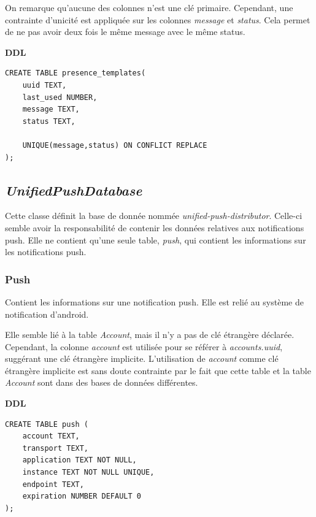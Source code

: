 \documentclass[a4paper,11pt]{article}
\begin{document}
On remarque qu'aucune des colonnes n'est une clé primaire. Cependant, une contrainte d'unicité est appliquée sur les colonnes \textit{message} et \textit{status}. Cela permet de ne pas avoir deux fois le même message avec le même status.

\textbf{DDL}
\begin{lstlisting}
CREATE TABLE presence_templates(
    uuid TEXT,
    last_used NUMBER,
    message TEXT,
    status TEXT,
    
    UNIQUE(message,status) ON CONFLICT REPLACE
);
\end{lstlisting}

\subsection{\textit{UnifiedPushDatabase}}

Cette classe définit la base de donnée nommée \textit{unified-push-distributor}. Celle-ci semble avoir la responsabilité de contenir les données relatives aux notifications push. Elle ne contient qu'une seule table, \textit{push}, qui contient les informations sur les notifications push.

\subsubsection{Push}

Contient les informations sur une notification push. Elle est relié au système de notification d'android.

Elle semble lié à la table \textit{Account}, mais il n'y a pas de clé étrangère déclarée. Cependant, la colonne \textit{account} est utilisée pour se référer à \textit{accounts.uuid}, suggérant une clé étrangère implicite. L'utilisation de \textit{account} comme clé étrangère implicite est sans doute contrainte par le fait que cette table et la table \textit{Account} sont dans des bases de données différentes.

\textbf{DDL}
\begin{lstlisting}
CREATE TABLE push (
	account TEXT,
	transport TEXT,
	application TEXT NOT NULL,
	instance TEXT NOT NULL UNIQUE,
	endpoint TEXT,
	expiration NUMBER DEFAULT 0
);
\end{lstlisting}

\end{document}
